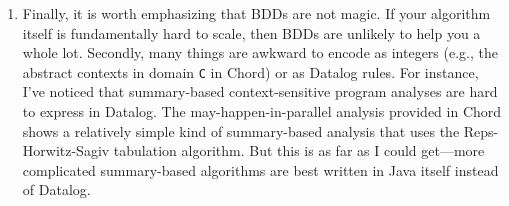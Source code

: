 \begin{enumerate}
\item

Finally, it is worth emphasizing that BDDs are not magic.
If your algorithm itself is fundamentally hard to scale, then BDDs are
unlikely to help you a whole lot.  Secondly, many things are awkward to
encode as integers (e.g., the abstract contexts in domain \verb+C+ 
in Chord) or as Datalog rules.
For instance, I've noticed that summary-based context-sensitive program
analyses are hard to express in Datalog.  The may-happen-in-parallel
analysis provided in Chord shows a relatively simple kind of summary-based
analysis that uses the Reps-Horwitz-Sagiv tabulation algorithm.  But this
is as far as I could get---more complicated summary-based algorithms are
best written in Java itself instead of Datalog.
\end{enumerate}

